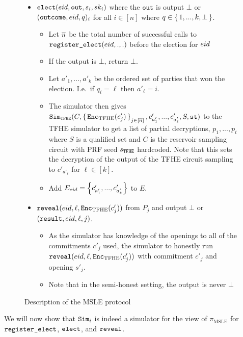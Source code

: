 \begin{figure}
{\begin{minipage}{1\textwidth}
\begin{itemize}

				\item $\texttt{elect}({eid}, \texttt{out}, s_i, sk_i)$ where the $\texttt{out}$ is output $\bot$ or $(\texttt{outcome}, {eid}, q)_i$ for all $i \in [n]$ where $q \in \set{1, ..., k, \bot}$.
				      \begin{itemize}
								\item Let $\overline{n}$ be the total number of successful calls to $\texttt{register\_elect}({eid}, ., .)$ before the election for ${eid}$
					      \item If the output is $\bot$, return $\bot$.
					      \item Let $a'_1, ..., a'_k$ be the ordered set of parties that won the election. I.e.\ if $q_i = \ell$ then $a'_\ell = i$.
								\item The simulator then gives $\texttt{Sim}_{{\texttt{TFHE}}}(C, \set{\texttt{Enc}_{\mathrm{TFHE}}(c'_j)}_{j \in [\overline{n}]}, c'_{a'_1}, ..., c'_{a'_\ell}, S, \texttt{st})$
	to the TFHE simulator to get a list of partial decryptions, $p_1, ..., p_{t}$ where $S$ is a qualified set %
	and $C$ is the reservoir sampling circuit with PRF seed $s_{\texttt{TFHE}}$ hardcoded.
	Note that this sets the decryption of the output of the TFHE circuit sampling to $c'_{a'_\ell}$ for $\ell \in [k]$.
					      \item Add $E_{eid} = \left\{c'_{a'_1}, ..., c'_{a'_k}\right\}$ to $E$.
				      \end{itemize}
				\item $\texttt{reveal}({eid}, \ell, \texttt{Enc}_{\mathrm{TFHE}}(c'_j))$ from $P_j$ and output $\bot$ or $(\texttt{result}, {eid}, \ell, j)$.
				      \begin{itemize}
					      \item As the simulator has knowledge of the openings to all of the commitments $c'_j$ used, the simulator
								to honestly run $\texttt{reveal}({eid}, \ell, \texttt{Enc}_{\mathrm{TFHE}}(c'_j))$ with commitment $c'_j$ and opening $s'_j$.
								\item Note that in the semi-honest setting, the output is never $\bot$
				      \end{itemize}
			\end{itemize}
		\end{minipage}
	}
	\caption{Description of the MSLE protocol}
	\label{fig:protocolMSLE}
\end{figure}

We will now show that $\texttt{Sim}_i$ is indeed a simulator for the view of $\pi_{\text{MSLE}}$
for $\texttt{register\_elect}$, $\texttt{elect}$, and $\texttt{reveal}$.

